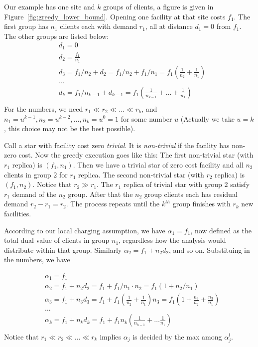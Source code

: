 \documentclass[oneside,final]{ucr}
\begin{document}
Our example has one site and $k$ groups of clients, a figure
is given in Figure~\ref{fig:greedy_lower_bound}. Opening
one facility at that site costs $f_1$. The first group has
$n_1$ clients each with demand $r_1$, all at distance $d_1 =
0$ from $f_1$. The other groups are listed below:
\begin{align*}
  &d_1 = 0\\
  &d_2 = \frac{f_1}{n_1}\\
  &d_3 = f_1/n_2 + d_2 = f_1/n_2 + f_1/n_1 = f_1 (\frac{1}{n_2} + \frac{1}{n_1})\\
  &\ldots\\
  &d_k = f_1/n_{k-1} + d_{k-1} = f_1 (\frac{1}{n_{k-1}} + \ldots + \frac{1}{n_1})\\
\end{align*}
For the numbers, we need $r_1 \ll r_2 \ll \ldots \ll r_k$,
and $n_1 = u^{k-1}, n_2 = u^{k-2}, \ldots, n_k = u^0 = 1$
for some number $u$ (Actually we take $u=k$, this choice may
not be the best possible).

Call a star with facility cost zero \emph{trivial}. It is
\emph{non-trivial} if the facility has non-zero cost. Now
the greedy execution goes like this: The first non-trivial
star (with $r_1$ replica) is $(f_1, n_1)$. Then we have a
trivial star of zero cost facility and all $n_2$ clients in
group $2$ for $r_1$ replica. The second non-trivial star
(with $r_2$ replica) is $(f_1, n_2)$. Notice that $r_2 \gg
r_1$. The $r_1$ replica of trivial star with group $2$
satisfy $r_1$ demand of the $n_2$ group. After that the
$n_2$ group clients each has residual demand $r_2 - r_1 =
r_2$. The process repeats until the $k^{th}$ group finishes
with $r_k$ new facilities.

According to our local charging assumption, we have
$\alpha_1 = f_1$, now defined as the total dual value of
clients in group $n_1$, regardless how the analysis would
distribute within that group. Similarly $\alpha_2 = f_1 +
n_2 d_2$, and so on. Substituing in the numbers, we have

\begin{align*}
  &\alpha_1 = f_1\\
  &\alpha_2 = f_1 + n_2 d_2 = f_1 + f_1/n_1\cdot n_2 = f_1 (1 + n_2 /
  n_1)\\
  &\alpha_3 = f_1 + n_3 d_3 = f_1 + f_1 (\frac{1}{n_2} +
  \frac{1}{n_1}) n_3 = f_1 (1 + \frac{n_3}{n_2} + \frac{n_3}{n_1})\\
  &\ldots\\
  &\alpha_k = f_1 + n_k d_k = f_1 + f_1 n_k (\frac{1}{n_{k-1}} + \ldots
  \frac{1}{n_1})\\
\end{align*}
Notice that $r_1 \ll r_2 \ll \ldots \ll r_k$ implies $\alpha_j$ is
decided by the max among $\alpha_j^l$.
\end{document}
